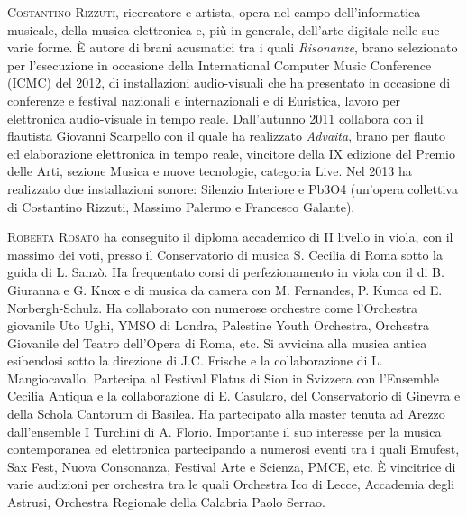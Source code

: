 \documentclass[9pt, twoside, a5paper]{extreport}
\newcommand{\biografia}[2]{%
\noindent \textsc{#1} %
#2 %
\medskip
}%
\begin{document}
\begin{multicols}{2}
\biografia{Costantino Rizzuti,}{ricercatore e artista, opera nel campo dell’informatica musicale, della musica elettronica e, più in generale, dell’arte digitale nelle sue varie forme. È autore di brani acusmatici tra i quali \textit{Risonanze}, brano selezionato per l’esecuzione in occasione della International Computer Music Conference (ICMC) del 2012, di installazioni audio-visuali che ha presentato in occasione di conferenze e festival nazionali e internazionali e di Euristica, lavoro per elettronica audio-visuale in tempo reale. Dall’autunno 2011 collabora con il flautista Giovanni Scarpello con il quale ha realizzato \textit{Advaita}, brano per flauto ed elaborazione elettronica in tempo reale, vincitore della IX edizione del Premio delle Arti, sezione Musica e nuove tecnologie, categoria Live. Nel 2013 ha realizzato due installazioni sonore: Silenzio Interiore e Pb3O4 (un’opera collettiva di Costantino Rizzuti, Massimo Palermo e Francesco Galante).}


\biografia{Roberta Rosato}{ha conseguito il diploma accademico di II livello in viola, con il massimo dei voti, presso il Conservatorio di musica S. Cecilia di Roma sotto la guida di L. Sanzò. Ha frequentato corsi di perfezionamento in viola con il di B. Giuranna e G. Knox e di musica da camera con M. Fernandes, P. Kunca ed E. Norbergh-Schulz. Ha collaborato con numerose orchestre come l’Orchestra giovanile Uto Ughi, YMSO di Londra, Palestine Youth Orchestra, Orchestra Giovanile del Teatro dell'Opera di Roma, etc. Si avvicina alla musica antica esibendosi sotto la direzione di J.C. Frische e la collaborazione di L. Mangiocavallo. Partecipa al Festival Flatus di Sion in Svizzera con l’Ensemble Cecilia Antiqua e la collaborazione di E. Casularo, del Conservatorio di Ginevra e della Schola Cantorum di Basilea. Ha partecipato alla master tenuta ad Arezzo dall’ensemble I Turchini di A. Florio. Importante il suo interesse per la musica contemporanea ed elettronica partecipando a numerosi eventi tra i quali Emufest, Sax Fest, Nuova Consonanza, Festival Arte e Scienza, PMCE, etc. È vincitrice di varie audizioni per orchestra tra le quali Orchestra Ico di Lecce, Accademia degli Astrusi, Orchestra Regionale della Calabria Paolo Serrao.}


\end{multicols}
\end{document}
